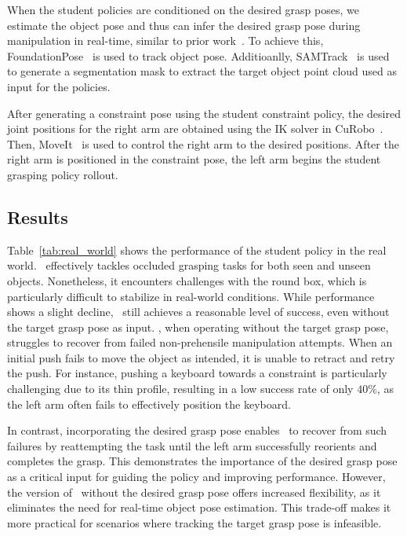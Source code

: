 When the student policies are conditioned on the desired grasp poses, we estimate the object pose and thus can infer the desired grasp pose during manipulation in real-time, similar to prior work~\cite{wan2023unidexgraspimprovingdexterousgrasping}.
To achieve this, FoundationPose~\cite{wen2024foundationpose} is used to track object pose.
Additioanlly, SAMTrack~\cite{cheng2023segment} is used to generate a segmentation mask to extract the target object point cloud used as input for the policies.


After generating a constraint pose using the student constraint policy, the desired joint positions for the right arm are obtained using the IK solver in CuRobo~\cite{sundaralingam2023curobo}.
Then, MoveIt~\cite{Coleman2014ReducingTB} is used to control the right arm to the desired positions.
After the right arm is positioned in the constraint pose, the left arm begins the student grasping policy rollout.



\subsection{Results}
Table~\ref{tab:real_world} shows the performance of the student policy in the real world.
\ourmethod~effectively tackles occluded grasping tasks for both seen and unseen objects. 
Nonetheless, it encounters challenges with the round box, which is particularly difficult to stabilize in real-world conditions. 
While performance shows a slight decline, \ourmethod~still achieves a reasonable level of success, even without the target grasp pose as input.
\ourmethod, when operating without the target grasp pose, struggles to recover from failed non-prehensile manipulation attempts. 
When an initial push fails to move the object as intended, it is unable to retract and retry the push. 
For instance, pushing a keyboard towards a constraint is particularly challenging due to its thin profile, resulting in a low success rate of only $40\%$, as the left arm often fails to effectively position the keyboard.

In contrast, incorporating the desired grasp pose enables \ourmethod~to recover from such failures by reattempting the task until the left arm successfully reorients and completes the grasp. 
This demonstrates the importance of the desired grasp pose as a critical input for guiding the policy and improving performance.
However, the version of \ourmethod~without the desired grasp pose offers increased flexibility, as it eliminates the need for real-time object pose estimation. 
This trade-off makes it more practical for scenarios where tracking the target grasp pose is infeasible.
